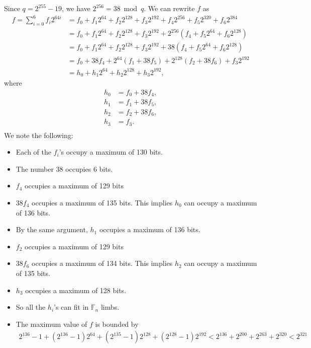 \documentclass[a4paper, 12pt]{article}
\begin{document}
Since $q = 2^{255}-19$, we have $2^{256} = 38 \bmod q$. We can rewrite $f$ as
\begin{align*}
  f  = \sum^{6}_{i=0} f_i 2^{64i} &= f_0 + f_1 2^{64} + f_2 2^{128} + f_3 2^{192} + f_4 2^{256} +   f_5 2^{320} + f_6 2^{384}\\
   &= f_0 + f_1 2^{64} + f_2 2^{128} + f_3 2^{192} + 2^{256} \left(  f_4 +   f_5 2^{64} + f_6 2^{128} \right)\\
   &= f_0 + f_1 2^{64} + f_2 2^{128} + f_3 2^{192} + 38 \left(  f_4 +   f_5 2^{64} + f_6 2^{128} \right)\\
   &= f_0 + 38 f_4 + 2^{64} \left( f_1 + 38f_5 \right)+ 2^{128} \left(  f_2 + 38 f_6\right) + f_3 2^{192}\\
   & = h_0 + h_1 2^{64} + h_2 2^{128} + h_3 2^{192},
\end{align*}
where
\begin{align*}
  h_0 & = f_0 + 38 f_4,\\
  h_1 & = f_1 + 38 f_5,\\
  h_2 & = f_2 + 38 f_6,\\
  h_3 & = f_3.\\
\end{align*}
We note the following:
\begin{itemize}
  \item Each of the $f_i$'s occupy a maximum of 130 bits.
  \item The number 38 occupies 6 bits.
  \item $f_4$ occupies a maximum of 129 bits
  \item $38f_4$ occupies a maximum of 135 bits. This implies $h_0$ can occupy a maximum of 136 bits.
  \item By the same argument, $h_1$ occupies a maximum of 136 bits.
  \item $f_2$ occupies a maximum of 129 bits
  \item $38f_6$ occupies a maximum of 134 bits. This implies $h_2$ can occupy a maximum of 135 bits.
  \item $h_3$ occupies a maximum of 128 bits.
  \item So all the $h_i$'s can fit in $\mathbb{F}_n$ limbs.
  \item The maximum value of $f$ is bounded by
    \begin{align*}
      2^{136} - 1 + \left(2^{136} - 1\right) 2^{64}+ \left( 2^{135}-1 \right)2^{128}+ \left( 2^{128}-1 \right)2^{192} < 2^{136} + 2^{200} + 2^{263} + 2^{320} < 2^{321}
    \end{align*}
\end{itemize}
\end{document}
